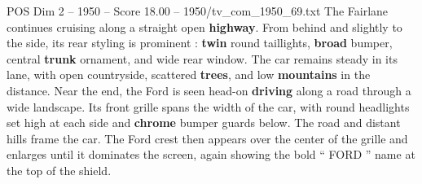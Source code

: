 \begin{textsample}{POS Dim 2 – 1950 – Score 18.00 – 1950/tv\_com\_1950\_69.txt}
The Fairlane continues cruising along a straight open \textbf{highway}.
From behind and slightly to the side, its rear styling is prominent : \textbf{twin} round taillights, \textbf{broad} bumper, central \textbf{trunk} ornament, and wide rear window.
The car remains steady in its lane, with open countryside, scattered \textbf{trees}, and low \textbf{mountains} in the distance.
Near the end, the Ford is seen head-on \textbf{driving} along a road through a wide landscape.
Its front grille spans the width of the car, with round headlights set high at each side and \textbf{chrome} bumper guards below.
The road and distant hills frame the car.
The Ford crest then appears over the center of the grille and enlarges until it dominates the screen, again showing the bold “ FORD ” name at the top of the shield.

\end{textsample}
